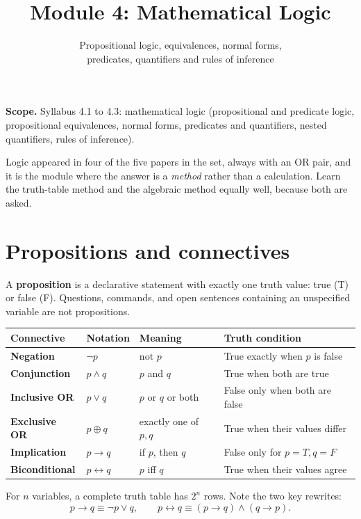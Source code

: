 \documentclass[11pt,a4paper]{article}
\title{\textbf{Module 4: Mathematical Logic}\\}
\author{\large Propositional logic, equivalences, normal forms,\\predicates, quantifiers and rules of inference}
\date{}
\begin{document}
\maketitle

\begin{exambox}
\textbf{Scope.} Syllabus 4.1 to 4.3: mathematical logic (propositional and predicate logic, propositional equivalences, normal forms, predicates and quantifiers, nested quantifiers, rules of inference).

Logic appeared in four of the five papers in the set, always with an OR pair, and it is the module where the answer is a \emph{method} rather than a calculation. Learn the truth-table method and the algebraic method equally well, because both are asked.
\end{exambox}

\tableofcontents
\newpage

\section{Propositions and connectives}

A \textbf{proposition} is a declarative statement with exactly one truth value: true (T) or false (F). Questions, commands, and open sentences containing an unspecified variable are not propositions.

\begin{center}\small
\begin{tabularx}{\textwidth}{>{\bfseries}p{} p{} X X}
\toprule Connective & Notation & Meaning & Truth condition\\\midrule
Negation & $\neg p$ & not $p$ & True exactly when $p$ is false\\
Conjunction & $p\land q$ & $p$ and $q$ & True when both are true\\
Inclusive OR & $p\lor q$ & $p$ or $q$ or both & False only when both are false\\
Exclusive OR & $p\oplus q$ & exactly one of $p,q$ & True when their values differ\\
Implication & $p\to q$ & if $p$, then $q$ & False only for $p=T,q=F$\\
Biconditional & $p\leftrightarrow q$ & $p$ iff $q$ & True when their values agree\\
\end{tabularx}
\end{center}

For $n$ variables, a complete truth table has $2^n$ rows. Note the two key rewrites:
\[
p\to q\equiv\neg p\lor q,\qquad p\leftrightarrow q\equiv(p\to q)\land(q\to p).
\]
\end{document}
